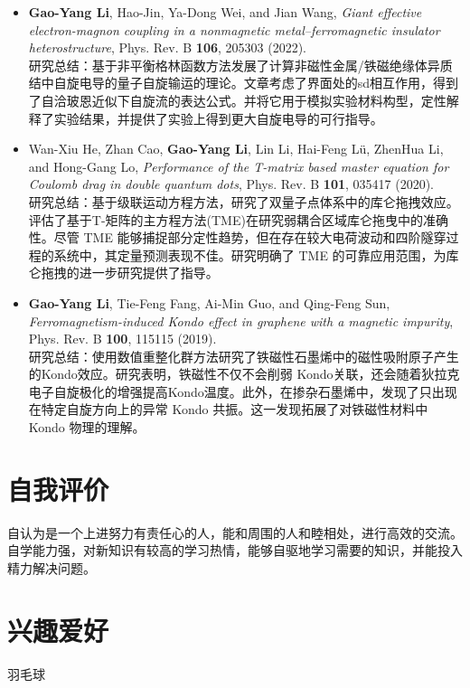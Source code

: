 \documentclass{resume}
\begin{document}
\begin{itemize}
\item \textbf{Gao-Yang Li}, Hao-Jin, Ya-Dong Wei, and Jian Wang, \textit{Giant effective electron-magnon coupling in a nonmagnetic metal–ferromagnetic insulator heterostructure}, Phys. Rev. B \textbf{106}, 205303 (2022).\\
研究总结：基于非平衡格林函数方法发展了计算非磁性金属/铁磁绝缘体异质结中自旋电导的量子自旋输运的理论。文章考虑了界面处的sd相互作用，得到了自洽玻恩近似下自旋流的表达公式。并将它用于模拟实验材料构型，定性解释了实验结果，并提供了实验上得到更大自旋电导的可行指导。
\item Wan-Xiu He, Zhan Cao, \textbf{Gao-Yang Li}, Lin Li, Hai-Feng Lü, ZhenHua Li, and Hong-Gang Lo, \textit{Performance of the T-matrix based master equation for Coulomb drag in double quantum dots}, Phys. Rev. B \textbf{101}, 035417 (2020).\\
研究总结：基于级联运动方程方法，研究了双量子点体系中的库仑拖拽效应。评估了基于T-矩阵的主方程方法(TME)在研究弱耦合区域库仑拖曳中的准确性。尽管 TME 能够捕捉部分定性趋势，但在存在较大电荷波动和四阶隧穿过程的系统中，其定量预测表现不佳。研究明确了 TME 的可靠应用范围，为库仑拖拽的进一步研究提供了指导。
\item \textbf{Gao-Yang Li}, Tie-Feng Fang, Ai-Min Guo, and Qing-Feng Sun, \textit{Ferromagnetism-induced Kondo effect in graphene with a magnetic impurity}, Phys. Rev. B \textbf{100}, 115115 (2019).\\
研究总结：使用数值重整化群方法研究了铁磁性石墨烯中的磁性吸附原子产生的Kondo效应。研究表明，铁磁性不仅不会削弱 Kondo关联，还会随着狄拉克电子自旋极化的增强提高Kondo温度。此外，在掺杂石墨烯中，发现了只出现在特定自旋方向上的异常 Kondo 共振。这一发现拓展了对铁磁性材料中 Kondo 物理的理解。
\end{itemize}


\section{自我评价}
\qquad 自认为是一个上进努力有责任心的人，能和周围的人和睦相处，进行高效的交流。自学能力强，对新知识有较高的学习热情，能够自驱地学习需要的知识，并能投入精力解决问题。

\section{兴趣爱好}
\qquad 羽毛球


%  
\end{document}

